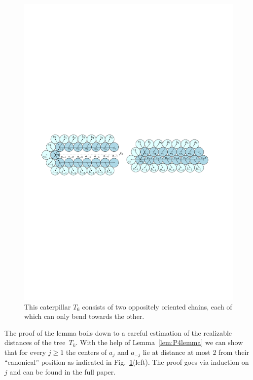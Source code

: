 \documentclass[runningheads]{article}
\begin{document}
\begin{figure}
\centering
\includegraphics[width=.8\textwidth]{fig-ushape}
\caption{This caterpillar $T_6$ consists of two oppositely oriented chains,
each of which can only bend towards the other.}
\label{fig:tree}
\end{figure}

The proof of the lemma boils down to a careful estimation of the realizable distances
of the tree~$T_k$. With the help of Lemma~\ref{lem:P4lemma} we can show that
for every $j\ge 1$ the centers of $a_j$ and $a_{-j}$ lie at distance
at most 2 from their ``canonical'' position as indicated
in Fig.~\ref{fig:tree}(left). The proof goes via induction on~$j$ and
can be found in the full paper.%
\end{document}
